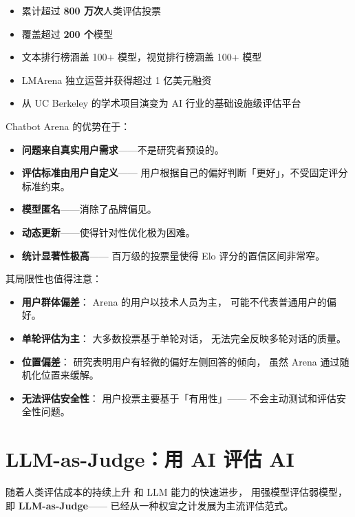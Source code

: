 \begin{corebox}
\begin{itemize}[noitemsep]
  \item 累计超过 \textbf{800 万次}人类评估投票
  \item 覆盖超过 \textbf{200 个}模型
  \item 文本排行榜涵盖 100+ 模型，视觉排行榜涵盖 100+ 模型
  \item LMArena 独立运营并获得超过 1 亿美元融资
  \item 从 UC Berkeley 的学术项目演变为
        AI 行业的基础设施级评估平台
\end{itemize}
\end{corebox}

Chatbot Arena 的优势在于：
\begin{itemize}[noitemsep]
  \item \textbf{问题来自真实用户需求}——不是研究者预设的。
  \item \textbf{评估标准由用户自定义}——
        用户根据自己的偏好判断「更好」，不受固定评分标准约束。
  \item \textbf{模型匿名}——消除了品牌偏见。
  \item \textbf{动态更新}——使得针对性优化极为困难。
  \item \textbf{统计显著性极高}——
        百万级的投票量使得 Elo 评分的置信区间非常窄。
\end{itemize}

其局限性也值得注意：
\begin{itemize}[noitemsep]
  \item \textbf{用户群体偏差}：
        Arena 的用户以技术人员为主，
        可能不代表普通用户的偏好。
  \item \textbf{单轮评估为主}：
        大多数投票基于单轮对话，
        无法完全反映多轮对话的质量。
  \item \textbf{位置偏差}：
        研究表明用户有轻微的偏好左侧回答的倾向，
        虽然 Arena 通过随机化位置来缓解。
  \item \textbf{无法评估安全性}：
        用户投票主要基于「有用性」——
        不会主动测试和评估安全性问题。
\end{itemize}

\section{LLM-as-Judge：用 AI 评估 AI}
\label{sec:llm-as-judge}

随着人类评估成本的持续上升
和 LLM 能力的快速进步，
用强模型评估弱模型，
即 \textbf{LLM-as-Judge}——
已经从一种权宜之计发展为主流评估范式。

